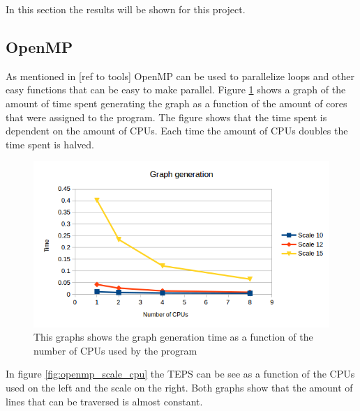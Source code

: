 In this section the results will be shown for this project.

\subsection{OpenMP}
\label{sec:openmp}
As mentioned in [ref to tools] OpenMP can be used to parallelize loops and other easy functions that can be easy to make parallel. Figure \ref{fig:graph_generation} shows a graph of the amount of time spent generating the graph as a function of the amount of cores that were assigned to the program. The figure shows that the time spent is  dependent on the amount of CPUs. Each time the amount of CPUs doubles the time spent is halved. 

\begin{figure}[!h]
\includegraphics[width=\textwidth]{images/openmp_graphgeneration.png}
\caption{This graphs shows the graph generation time as a function of the number of CPUs used by the program}
\label{fig:graph_generation}
\end{figure}


In figure \ref{fig:openmp_scale_cpu} the TEPS can be see as a function of the CPUs used on the left and the scale on the right. Both graphs show that the amount of lines that can be traversed is almost constant.

